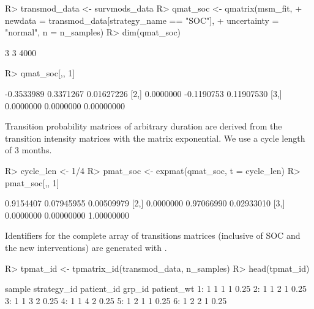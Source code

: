 \documentclass[article, nojss]{jss}\usepackage[]{graphicx}\usepackage[]{color}
\begin{document}
\begin{Schunk}
\begin{Sinput}
R> transmod_data <- survmods_data
R> qmat_soc <- qmatrix(msm_fit, 
+                      newdata = transmod_data[strategy_name == "SOC"],
+                      uncertainty = "normal", n = n_samples)
R> dim(qmat_soc)
\end{Sinput}
\begin{Soutput}
[1]    3    3 4000
\end{Soutput}
\begin{Sinput}
R> qmat_soc[,, 1]
\end{Sinput}
\begin{Soutput}
           [,1]       [,2]       [,3]
[1,] -0.3533989  0.3371267 0.01627226
[2,]  0.0000000 -0.1190753 0.11907530
[3,]  0.0000000  0.0000000 0.00000000
\end{Soutput}
\end{Schunk}

Transition probability matrices of arbitrary duration are derived from the transition intensity matrices with the matrix exponential. We use a cycle length of 3 months.

\begin{Schunk}
\begin{Sinput}
R> cycle_len <- 1/4
R> pmat_soc <- expmat(qmat_soc, t = cycle_len)
R> pmat_soc[,, 1]
\end{Sinput}
\begin{Soutput}
          [,1]       [,2]       [,3]
[1,] 0.9154407 0.07945955 0.00509979
[2,] 0.0000000 0.97066990 0.02933010
[3,] 0.0000000 0.00000000 1.00000000
\end{Soutput}
\end{Schunk}

Identifiers for the complete array of transitions matrices (inclusive of SOC and the new interventions) are generated with .

\begin{Schunk}
\begin{Sinput}
R> tpmat_id <- tpmatrix_id(transmod_data, n_samples)
R> head(tpmat_id)
\end{Sinput}
\begin{Soutput}
   sample strategy_id patient_id grp_id patient_wt
1:      1           1          1      1       0.25
2:      1           1          2      1       0.25
3:      1           1          3      2       0.25
4:      1           1          4      2       0.25
5:      1           2          1      1       0.25
6:      1           2          2      1       0.25
\end{Soutput}
\end{Schunk}
\end{document}
